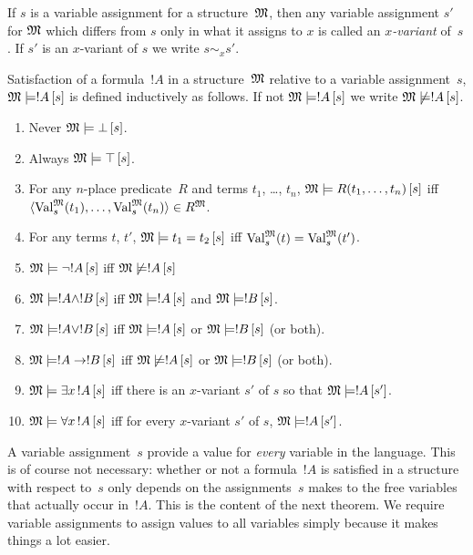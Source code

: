 \documentclass[syntax-and-semantics]{subfiles}
\begin{document}
\begin{defn}[$x$-Variant]
If $s$ is a variable assignment for a structure~$\mathfrak M$, then any
variable assignment $s'$ for $\mathfrak M$ which differs from $s$ only
in what it assigns to $x$ is called an \emph{$x$-variant} of~$s$.  If
$s'$ is an $x$-variant of $s$ we write $s \sim_x s'$.
\end{defn}

\begin{defn}[Satisfaction]
Satisfaction of a formula~$!A$ in a structure~$\mathfrak M$ relative to
a variable assignment~$s$, $\Sat{M}{!A}[s]$ is defined inductively as
follows. If not $\Sat{M}{!A}[s]$ we write $\Sat/{M}{!A}[s]$.
\begin{enumerate}
\item Never $\Sat{M}{\lfalse}[s]$.
\item Always $\Sat{M}{\ltrue}[s]$.
\item For any $n$-place predicate~$R$ and terms $t_1$, \dots, $t_n$,
  $\Sat{M}{\Atom{R}{t_1, \dots, t_n}}[s]$ iff $\langle \Value{t_1}{M}[s],
  \dots, \Value{t_n}{M}[s] \rangle \in \Assign{R}{M}$.
\item For any terms $t$, $t'$, $\Sat{M}{t_1 = t_2}[s]$ iff
  $\Value{t}{M}[s] = \Value{t'}{M}[s]$.
\item $\Sat{M}{\lnot !A}[s]$ iff $\Sat/{M}{!A}[s]$
\item $\Sat{M}{!A \land !B}[s]$ iff $\Sat{M}{!A}[s]$ and $\Sat{M}{!B}[s]$.
\item $\Sat{M}{!A \lor !B}[s]$ iff $\Sat{M}{!A}[s]$ or
  $\Sat{M}{!B}[s]$ (or both).
\item $\Sat{M}{!A \lif !B}[s]$ iff $\Sat/{M}{!A}[s]$ or
  $\Sat{M}{!B}[s]$ (or both).
\item $\Sat{M}{\lexists[x][!A]}[s]$ iff there is an $x$-variant $s'$
  of $s$ so that $\Sat{M}{!A}[s']$.
\item $\Sat{M}{\lforall[x][!A]}[s]$ iff for every $x$-variant $s'$ of
  $s$, $\Sat{M}{!A}[s']$.
\end{enumerate}
\end{defn}

\begin{wordy}
A variable assignment~$s$ provide a value for \emph{every} variable in
the language. This is of course not necessary: whether or not a
formula~$!A$ is satisfied in a structure with respect to~$s$ only
depends on the assignments~$s$ makes to the free variables that
actually occur in~$!A$.  This is the content of the next theorem.  We
require variable assignments to assign values to all variables simply
because it makes things a lot easier.
\end{wordy}
\end{document}
